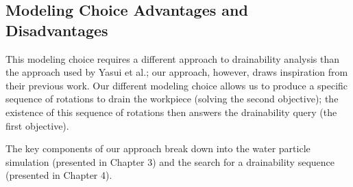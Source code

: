 	\subsection{Modeling Choice Advantages and Disadvantages}

This modeling choice requires a different approach to drainability analysis than the approach used by Yasui et al.; our approach, however, draws inspiration from their previous work. Our different modeling choice allows us to produce a specific sequence of rotations to drain the workpiece (solving the second objective); the existence of this sequence of rotations then answers the drainability query (the first objective).

The key components of our approach break down into the water particle simulation (presented in Chapter 3) and the search for a drainability sequence (presented in Chapter 4).



